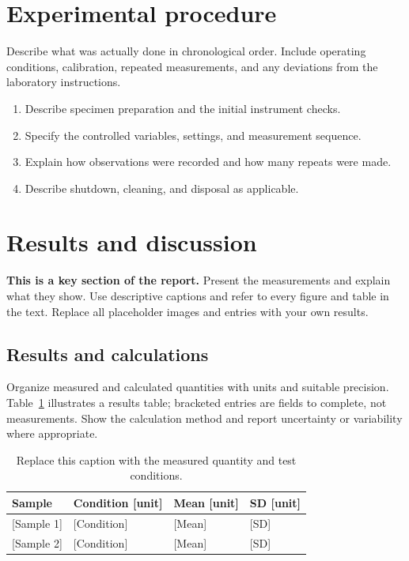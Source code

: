 \documentclass[12pt]{article}
\begin{document}
\section{Experimental procedure}
Describe what was actually done in chronological order. Include operating
conditions, calibration, repeated measurements, and any deviations from the
laboratory instructions.
\begin{enumerate}
  \item Describe specimen preparation and the initial instrument checks.
  \item Specify the controlled variables, settings, and measurement sequence.
  \item Explain how observations were recorded and how many repeats were made.
  \item Describe shutdown, cleaning, and disposal as applicable.
\end{enumerate}

\section{Results and discussion}
\textbf{This is a key section of the report.} Present the measurements and explain
what they show. Use descriptive captions and refer to every figure and table in
the text. Replace all placeholder images and entries with your own results.

\subsection{Results and calculations}
Organize measured and calculated quantities with units and suitable precision.
Table~\ref{tab:results} illustrates a results table; bracketed entries are fields
to complete, not measurements. Show the calculation method and report uncertainty
or variability where appropriate.
\begin{table}[htbp]
  \centering
  \caption{Replace this caption with the measured quantity and test conditions.}
  \label{tab:results}
  \begin{tabularx}{\linewidth}{@{}lXXX@{}}
    \toprule
    Sample & Condition [unit] & Mean [unit] & SD [unit] \\
    \midrule
    {[Sample 1]} & [Condition] & [Mean] & [SD] \\
    {[Sample 2]} & [Condition] & [Mean] & [SD] \\
    \bottomrule
  \end{tabularx}
\end{table}
\end{document}
